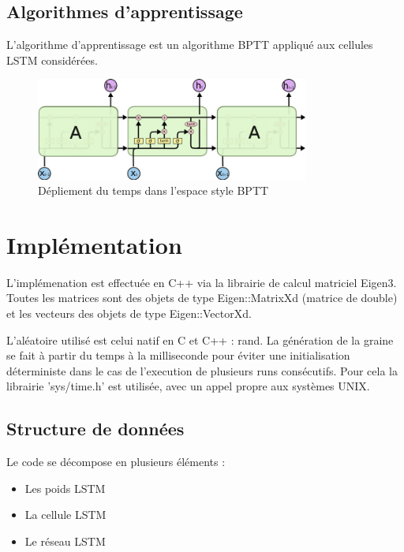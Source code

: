 \subsection{Algorithmes d'apprentissage}
L'algorithme d'apprentissage est un algorithme BPTT appliqué aux cellules
LSTM considérées.

\begin{figure}[!ht]
\begin{center}
\includegraphics[width=0.8\textwidth]{images/lstm-bptt.png}
\end{center}
\caption{Dépliement du temps dans l'espace style BPTT}
\end{figure}

\section{Implémentation}

L'implémenation est effectuée en C++ via la librairie de calcul matriciel
Eigen3. Toutes les matrices sont des objets de type Eigen::MatrixXd (matrice de
double) et les vecteurs des objets de type Eigen::VectorXd.

\medskip

L'aléatoire utilisé est celui natif en C et C++ : rand.
La génération de la graine se fait à partir du temps à la milliseconde pour
éviter une initialisation déterministe dans le cas de l'execution de plusieurs
runs consécutifs. Pour cela la librairie 'sys/time.h' est utilisée, avec un
appel propre aux systèmes UNIX.

\bigskip

\subsection{Structure de données}

Le code se décompose en plusieurs éléments : 

\medskip

\begin{itemize}

  \item Les poids LSTM
  \item La cellule LSTM
  \item Le réseau LSTM

\end{itemize}
